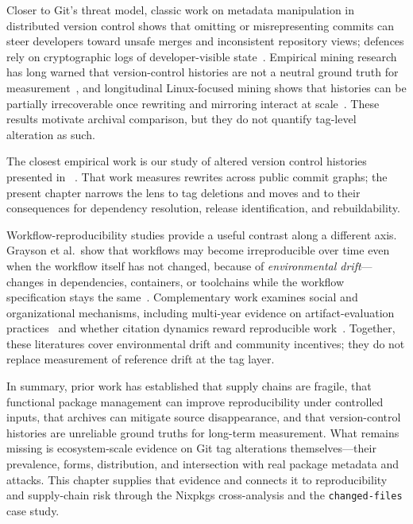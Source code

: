 Closer to Git's threat model, classic work on metadata manipulation in distributed version control shows that omitting or misrepresenting commits can steer developers toward unsafe merges and inconsistent repository views; defences rely on cryptographic logs of developer-visible state~\cite{torresarias2016gitmetadata}.
Empirical mining research has long warned that version-control histories are not a neutral ground truth for measurement~\cite{bird2009promisesmininggit,kalliamvakou2014promises}, and longitudinal Linux-focused mining shows that histories can be partially irrecoverable once rewriting and mirroring interact at scale~\cite{DBLP:journals/ese/GermanAH16}.
These results motivate archival comparison, but they do not quantify tag-level alteration as such.

The closest empirical work is our study of altered version control histories presented in ~\cite{DBLP:conf/kbse/RapaportPTZ25}.
That work measures rewrites across public commit graphs; the present chapter narrows the lens to tag deletions and moves and to their consequences for dependency resolution, release identification, and rebuildability.

Workflow-reproducibility studies provide a useful contrast along a different axis.
Grayson et al.~show that workflows may become irreproducible over time even when the workflow itself has not changed, because of \emph{environmental drift}---changes in dependencies, containers, or toolchains while the workflow specification stays the same~\cite{DBLP:conf/acmrep/GraysonMKM23}.
Complementary work examines social and organizational mechanisms, including multi-year evidence on artifact-evaluation practices~\cite{DBLP:conf/acmrep/OlszewskiLCBLBT25, DBLP:conf/acmrep/DEliaDGMPPPSSV25} and whether citation dynamics reward reproducible work~\cite{DBLP:conf/acmrep/Raff23}.
Together, these literatures cover environmental drift and community incentives; they do not replace measurement of reference drift at the tag layer.

In summary, prior work has established that supply chains are fragile, that functional package management can improve reproducibility under controlled inputs, that archives can mitigate source disappearance, and that version-control histories are unreliable ground truths for long-term measurement.
What remains missing is ecosystem-scale evidence on Git tag alterations themselves---their prevalence, forms, distribution, and intersection with real package metadata and attacks.
This chapter supplies that evidence and connects it to reproducibility and supply-chain risk through the Nixpkgs cross-analysis and the \texttt{changed-files} case study.

